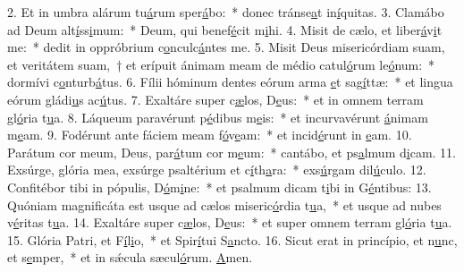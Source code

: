 2. Et in umbra alárum tu\uline{á}rum sper\uline{á}bo:~* donec tránse\uline{a}t in\uline{í}quitas.
3. Clamábo ad Deum alt\uline{í}ss\uline{i}mum:~* Deum, qui benef\uline{é}cit m\uline{i}hi.
4. Misit de cælo, et liber\uline{á}v\uline{i}t me:~* dedit in oppróbrium c\uline{o}nculc\uline{á}ntes me.
5. Misit Deus misericórdiam suam, et veritátem suam,~† et erípuit ánimam meam de médio catul\uline{ó}rum le\uline{ó}num:~* dormívi c\uline{o}nturb\uline{á}tus.
6. Fílii hóminum dentes eórum arma \uline{e}t sag\uline{í}ttæ:~* et lingua eórum gládi\uline{u}s ac\uline{ú}tus.
7. Exaltáre super c\uline{æ}los, D\uline{e}us:~* et in omnem terram gl\uline{ó}ria t\uline{u}a.
8. Láqueum paravérunt p\uline{é}dibus m\uline{e}is:~* et incurvavérunt \uline{á}nimam m\uline{e}am.
9. Fodérunt ante fáciem meam f\uline{ó}v\uline{e}am:~* et incid\uline{é}runt in \uline{e}am.
10. Parátum cor meum, Deus, par\uline{á}tum cor m\uline{e}um:~* cantábo, et ps\uline{a}lmum d\uline{i}cam.
11. Exsúrge, glória mea, exsúrge psaltérium et c\uline{í}th\uline{a}ra:~* exs\uline{ú}rgam dil\uline{ú}culo.
12. Confitébor tibi in pópulis, D\uline{ó}m\uline{i}ne:~* et psalmum dicam t\uline{i}bi in G\uline{é}ntibus:
13. Quóniam magnificáta est usque ad cælos miseric\uline{ó}rdia t\uline{u}a,~* et usque ad nubes v\uline{é}ritas t\uline{u}a.
14. Exaltáre super c\uline{æ}los, D\uline{e}us:~* et super omnem terram gl\uline{ó}ria t\uline{u}a.
15. Glória Patri, et F\uline{í}l\uline{i}o,~* et Spir\uline{í}tui S\uline{a}ncto.
16. Sicut erat in princípio, et n\uline{u}nc, et s\uline{e}mper,~* et in sǽcula sæcul\uline{ó}rum. \uline{A}men.
